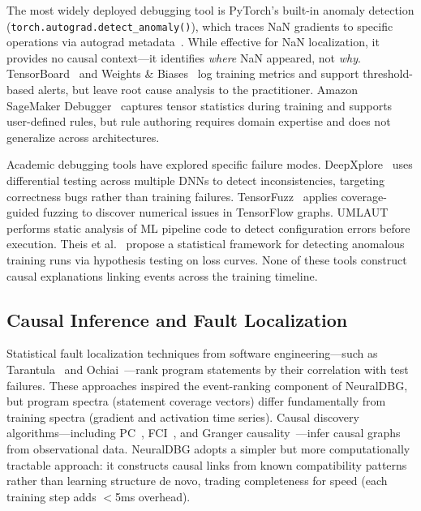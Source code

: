 \documentclass[11pt]{article}
\begin{document}
The most widely deployed debugging tool is PyTorch's built-in anomaly detection (\texttt{torch.autograd.detect\_anomaly()}), which traces NaN gradients to specific operations via autograd metadata~\cite{paszke2019pytorch}. While effective for NaN localization, it provides no causal context—it identifies \emph{where} NaN appeared, not \emph{why}. TensorBoard~\cite{abadi2016tensorflow} and Weights \& Biases~\cite{biewald2020wandb} log training metrics and support threshold-based alerts, but leave root cause analysis to the practitioner. Amazon SageMaker Debugger~\cite{nigenda2022sagemaker} captures tensor statistics during training and supports user-defined rules, but rule authoring requires domain expertise and does not generalize across architectures.

Academic debugging tools have explored specific failure modes. DeepXplore~\cite{pei2017deepxplore} uses differential testing across multiple DNNs to detect inconsistencies, targeting correctness bugs rather than training failures. TensorFuzz~\cite{odena2019tensorfuzz} applies coverage-guided fuzzing to discover numerical issues in TensorFlow graphs. UMLAUT~\cite{schoop2022umlaut} performs static analysis of ML pipeline code to detect configuration errors before execution. Theis et al.~\cite{theis2017detecting} propose a statistical framework for detecting anomalous training runs via hypothesis testing on loss curves. None of these tools construct causal explanations linking events across the training timeline.

\subsection{Causal Inference and Fault Localization}

Statistical fault localization techniques from software engineering—such as Tarantula~\cite{jones2005tarantula} and Ochiai~\cite{abreu2007ochiai}—rank program statements by their correlation with test failures. These approaches inspired the event-ranking component of NeuralDBG, but program spectra (statement coverage vectors) differ fundamentally from training spectra (gradient and activation time series). Causal discovery algorithms—including PC~\cite{spirtes2000causation}, FCI~\cite{zhang2008fci}, and Granger causality~\cite{granger1969causal}—infer causal graphs from observational data. NeuralDBG adopts a simpler but more computationally tractable approach: it constructs causal links from known compatibility patterns rather than learning structure de novo, trading completeness for speed (each training step adds $<$5ms overhead).
\end{document}
